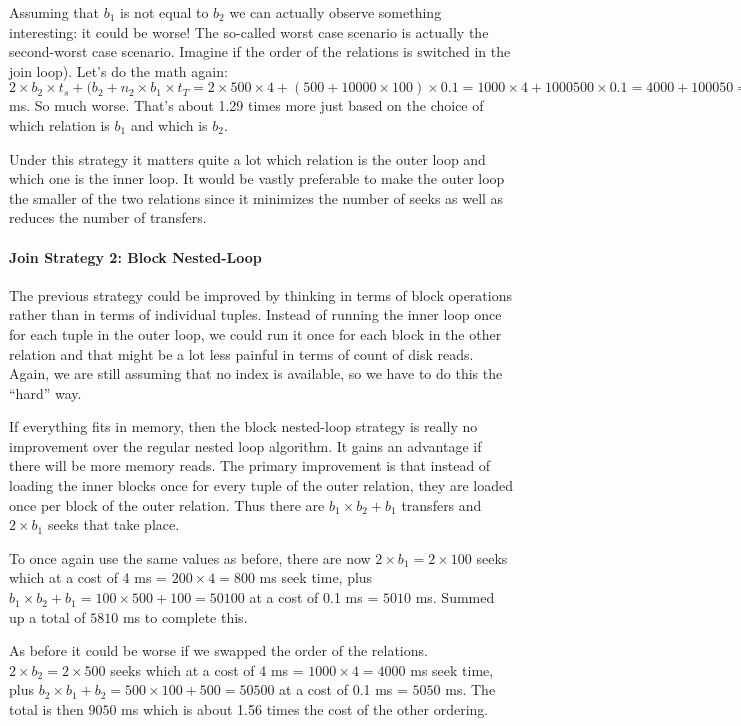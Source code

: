 \documentclass[a4paper]{report}
\begin{document}
Assuming that $b_{1}$ is not equal to $b_{2}$ we can actually observe something interesting: it could be worse! The so-called worst case scenario is actually the second-worst case scenario. Imagine if the order of the relations is switched in the join loop). Let's do the math again: $2 \times b_{2} \times t_{s} + (b_{2} + n_{2} \times b_{1} \times t_{T} = 2 \times 500 \times 4 + (500 + 10000 \times 100) \times 0.1 = 1000 \times 4 + 1000500 \times 0.1 = 4000 + 100050 = 104050$ ms. So much worse. That's about 1.29 times more just based on the choice of which relation is $b_{1}$ and which is $b_{2}$.

Under this strategy it matters quite a lot which relation is the outer loop and which one is the inner loop. It would be vastly preferable to make the outer loop the smaller of the two relations since it minimizes the number of seeks as well as reduces the number of transfers. 

\paragraph{Join Strategy 2: Block Nested-Loop}
The previous strategy could be improved by thinking in terms of block operations rather than in terms of individual tuples. Instead of running the inner loop once for each tuple in the outer loop, we could run it once for each block in the other relation and that might be a lot less painful in terms of count of disk reads. Again, we are still assuming that no index is available, so we have to do this the ``hard'' way.

If everything fits in memory, then the block nested-loop strategy is really no improvement over the regular nested loop algorithm. It gains an advantage if there will be more memory reads. The primary improvement is that instead of loading the inner blocks once for every tuple of the outer relation, they are loaded once per block of the outer relation. Thus there are $b_{1} \times b_{2} + b_{1}$ transfers and $2\times b_{1}$ seeks that take place.

To once again use the same values as before, there are now $2 \times b_{1} = 2 \times 100 $ seeks which at a cost of 4 ms = $200 \times 4 = 800$ ms seek time, plus $b_{1} \times b_{2} + b_{1} = 100 \times 500 + 100 = 50100$ at a cost of 0.1 ms = $5010$ ms. Summed up a total of $5810$ ms to complete this.

As before it could be worse if we swapped the order of the relations. $2 \times b_{2} = 2 \times 500 $ seeks which at a cost of 4 ms = $1000 \times 4 = 4000$ ms seek time, plus $b_{2} \times b_{1} + b_{2} = 500 \times 100 + 500 = 50500$ at a cost of 0.1 ms = $5050$ ms. The total is then $9050$ ms which is about 1.56 times the cost of the other ordering. 
\end{document}

